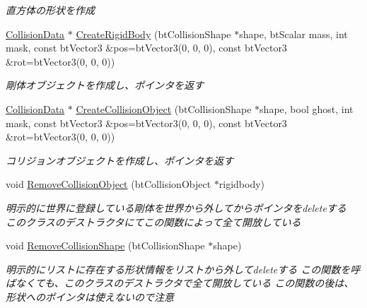 \begin{DoxyCompactItemize}
\begin{DoxyCompactList}\small\item\em 直方体の形状を作成 \end{DoxyCompactList}\item 
\mbox{\hyperlink{class_k___physics_1_1_collision_data}{Collision\+Data}} $\ast$ \mbox{\hyperlink{class_k___physics_1_1_bullet_physics_ad8d394a940bd7504521d3345173b15cc}{Create\+Rigid\+Body}} (bt\+Collision\+Shape $\ast$shape, bt\+Scalar mass, int mask, const bt\+Vector3 \&pos=bt\+Vector3(0, 0, 0), const bt\+Vector3 \&rot=bt\+Vector3(0, 0, 0))
\begin{DoxyCompactList}\small\item\em 剛体オブジェクトを作成し、ポインタを返す \end{DoxyCompactList}\item 
\mbox{\hyperlink{class_k___physics_1_1_collision_data}{Collision\+Data}} $\ast$ \mbox{\hyperlink{class_k___physics_1_1_bullet_physics_ae8587763df623623783cce96a444ea15}{Create\+Collision\+Object}} (bt\+Collision\+Shape $\ast$shape, bool ghost, int mask, const bt\+Vector3 \&pos=bt\+Vector3(0, 0, 0), const bt\+Vector3 \&rot=bt\+Vector3(0, 0, 0))
\begin{DoxyCompactList}\small\item\em コリジョンオブジェクトを作成し、ポインタを返す \end{DoxyCompactList}\item 
void \mbox{\hyperlink{class_k___physics_1_1_bullet_physics_ad5e9e30666e87099f84dc5b2c009c4d4}{Remove\+Collision\+Object}} (bt\+Collision\+Object $\ast$rigidbody)
\begin{DoxyCompactList}\small\item\em 明示的に世界に登録している剛体を世界から外してからポインタをdeleteする~\newline
このクラスのデストラクタにてこの関数によって全て開放している \end{DoxyCompactList}\item 
void \mbox{\hyperlink{class_k___physics_1_1_bullet_physics_a1501fdf81207cffa2b1b964d6a38129e}{Remove\+Collision\+Shape}} (bt\+Collision\+Shape $\ast$shape)
\begin{DoxyCompactList}\small\item\em 明示的にリストに存在する形状情報をリストから外してdeleteする この関数を呼ばなくても、このクラスのデストラクタで全て開放している この関数の後は、形状へのポインタは使えないので注意 \end{DoxyCompactList}\item 

\end{DoxyCompactItemize}
